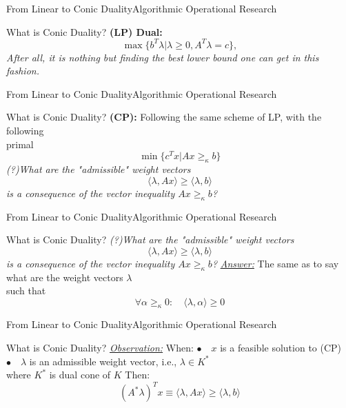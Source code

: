 \documentclass[11pt,aspectratio=169]{beamer}
\newcommand{\TT}{From Linear to Conic Duality}
\newcommand{\TL}{Algorithmic Operational Research}
\newcommand{\IN}{What is Conic Duality?}
\begin{document}
\begin{frame}{\TT}{\TL}
 \begin{block}{\IN}
 \Large
 \textbf{(LP) Dual:}
$$\max\{b^T\lambda |\lambda \geq 0, A^T\lambda = c \},$$
\textit{After all, it is nothing but finding the best lower bound one can get in this fashion.}
 \end{block}
\end{frame}

\begin{frame}{\TT}{\TL}
 \begin{block}{\IN}
 \Large 
 \textbf{(CP):}
 Following the same scheme of LP, with the following\\ \hspace{9mm} primal
 $$\min\{c^Tx|Ax \geq_\kappa b \}$$\newline
 \textit{(?)What are the "admissible" weight vectors
 $$\langle \lambda, Ax \rangle \geq \langle \lambda,b \rangle$$ is a consequence of the vector inequality $Ax 
 \geq_{\kappa}b$?}
 \end{block}
\end{frame}

\begin{frame}{\TT}{\TL}
 \begin{block}{\IN}
\Large
 \textit{(?)What are the "admissible" weight vectors
 $$\langle \lambda, Ax \rangle \geq \langle \lambda,b \rangle$$ is a consequence of the vector inequality $Ax 
 \geq_{\kappa}b$?}\newline
 \underline{\textit{Answer:}}
 The same as to say what are the weight vectors $\lambda$\\ \hspace{19mm} such that 
 $$\forall \alpha \geq_{\kappa}0 : \quad \langle \lambda, \alpha \rangle \geq 0$$
 \end{block}
\end{frame}

\begin{frame}{\TT}{\TL}
 \begin{block}{\IN}
 \Large
 \underline{\textit{Observation:}} \newline When: \newline
 $\bullet \quad x$ is a feasible solution to (CP) \newline
 $\bullet \quad \lambda$ is an admissible weight vector, i.e., $\lambda \in K^*$\\ \hspace{7mm} where $K^*$ is dual cone of $K$\newline
 Then:
 $$(A^* \lambda)^T x \equiv \langle \lambda , Ax \rangle \geq \langle \lambda, b \rangle$$
 \end{block}
\end{frame}
\end{document}
